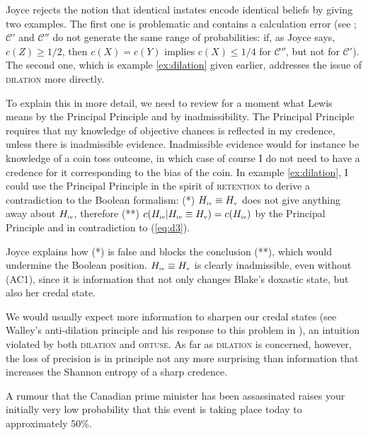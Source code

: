\documentclass[11pt]{article}
\begin{document}
Joyce rejects the notion that identical instates encode identical
beliefs by giving two examples. The first one is problematic and
contains a calculation error (see ;
$\mathcal{C}'$ and $\mathcal{C}''$ do not generate the same range of
probabilities: if, as Joyce says, $c(Z)\geq1/2$, then $c(X)=c(Y)$
implies $c(X)\leq{}1/4$ for $\mathcal{C}''$, but not for
$\mathcal{C}'$). The second one, which is example \ref{ex:dilation}
given earlier, addresses the issue of \textsc{dilation} more directly.

To explain this in more detail, we need to review for a moment what
Lewis means by the Principal Principle and by inadmissibility. The
Principal Principle requires that my knowledge of objective chances is
reflected in my credence, unless there is inadmissible evidence.
Inadmissible evidence would for instance be knowledge of a coin toss
outcome, in which case of course I do not need to have a credence for
it corresponding to the bias of the coin. In example
\ref{ex:dilation}, I could use the Principal Principle in the spirit
of \textsc{retention} to derive a contradiction to the Boolean
formalism: (*) $H_{\mbox{\tiny{iv}}}\equiv{}H_{\mbox{\tiny{v}}}$ does
not give anything away about $H_{\mbox{\tiny{iv}}}$, therefore (**)
$c(H_{\mbox{\tiny{iv}}}|H_{\mbox{\tiny{iv}}}\equiv{}H_{\mbox{\tiny{v}}})=c(H_{\mbox{\tiny{iv}}})$
by the Principal Principle and in contradiction to (\ref{eq:d3}).

Joyce explains how (*) is false and blocks the conclusion (**), which
would undermine the Boolean position.
$H_{\mbox{\tiny{iv}}}\equiv{}H_{\mbox{\tiny{v}}}$ is clearly
inadmissible, even without (AC1), since it is information that not
only changes Blake's doxastic state, but also her credal state.

We would usually expect more information to sharpen our credal states
(see Walley's anti-dilation principle and his response to this problem
in ), an intuition violated by both
\textsc{dilation} and \textsc{obtuse}. As far as \textsc{dilation} is
concerned, however, the loss of precision is in principle not any more
surprising than information that increases the Shannon entropy of a
sharp credence.

\begin{quotex}
  \label{ex:rumour} A rumour that the Canadian prime
  minister has been assassinated raises your initially very low
  probability that this event is taking place today to approximately
  50\%.
\end{quotex}
\end{document}
